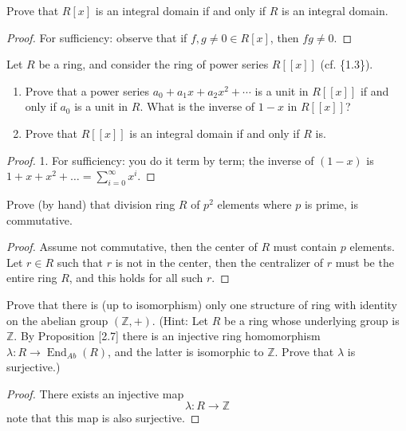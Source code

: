 \documentclass[openany]{book}
\newcommand{\Z}{\mathbb{Z}}
\begin{document}
\begin{prob}[1.15]
    Prove that \( R[x] \) is an integral domain if and only if \( R \) is an integral domain.
\end{prob}
\begin{proof}
    For sufficiency: observe that if $f,g\neq 0\in R[x]$, then $fg\neq 0$.
\end{proof}


\begin{prob}[1.16]
    Let \( R \) be a ring, and consider the ring of power series \( R[[x]] \) (cf. \{1.3\}).

\begin{enumerate}
    \item Prove that a power series \( a_0 + a_1 x + a_2 x^2 + \cdots \) is a unit in \( R[[x]] \) if and only if \( a_0 \) is a unit in \( R \). What is the inverse of \( 1 - x \) in \( R[[x]] \)?
    \item Prove that \( R[[x]] \) is an integral domain if and only if \( R \) is.
\end{enumerate}
\end{prob}
\begin{proof}
    1. For sufficiency: you do it term by term; the inverse of $(1-x)$ is $1+x+x^2+\dots=\sum_{i=0}^\infty x^i$.
\end{proof}




\begin{prob}[2.11]
    Prove (by hand) that division ring $R$ of $p^2$ elements where $p$ is prime, is commutative.
\end{prob}
\begin{proof}
    Assume not commutative, then the center of $R$ must contain $p$ elements. Let $r\in R$ such that $r$ is not in the center, then the centralizer of $r$ must be the entire ring $R$, and this holds for all such $r$.
\end{proof}

\begin{prob}[2.16]
    Prove that there is (up to isomorphism) only one structure of ring with identity on the abelian group $(\mathbb{Z}, +)$. (Hint: Let $R$ be a ring whose underlying group is $\mathbb{Z}$. By Proposition [2.7] there is an injective ring homomorphism $\lambda : R \to \operatorname{End}_{Ab}(R)$, and the latter is isomorphic to $\mathbb{Z}$. Prove that $\lambda$ is surjective.)
\end{prob}
\begin{proof}
    There exists an injective map 
    \begin{equation*}
        \lambda: R\to\Z
    \end{equation*}
    note that this map is also surjective.
\end{proof}
\end{document}

